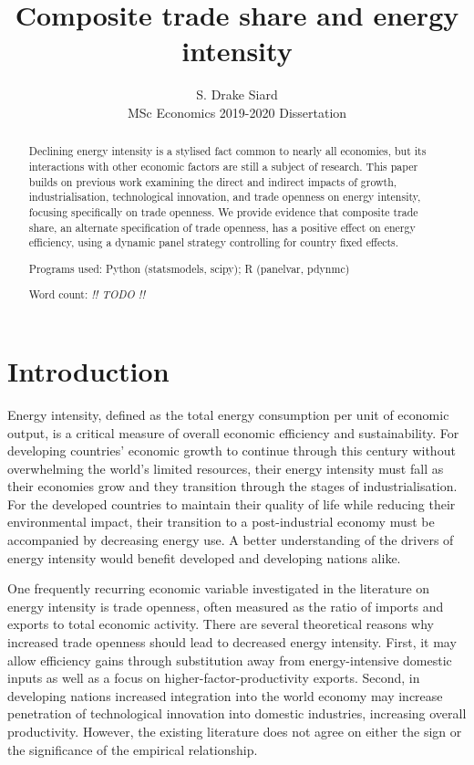 \documentclass[12pt,a4paper]{article}
\title{Composite trade share and energy intensity}
\author{S. Drake Siard\\
MSc Economics 2019-2020 Dissertation}
\date{}
\newcommand{\pkg}[1]{{\fontseries{b}\selectfont #1}}
\begin{document}
\maketitle

\begin{abstract}
Declining energy intensity is a stylised fact common to nearly all economies, but its interactions with other economic factors are still a subject of research.
This paper builds on previous work examining the direct and indirect impacts of growth, industrialisation, technological innovation, and trade openness on energy intensity, focusing specifically on trade openness. 
We provide evidence that composite trade share, an alternate specification of trade openness, has a positive effect on energy efficiency, using a dynamic panel strategy controlling for country fixed effects. 

Programs used: Python (\pkg{statsmodels}, \pkg{scipy}); R (\pkg{panelvar}, \pkg{pdynmc})

Word count: \emph{!! TODO !!}
 
\end{abstract}

\pagebreak

\tableofcontents

\pagebreak

\section{Introduction}\label{sec:introduction}

Energy intensity, defined as the total energy consumption per unit of economic output, is a critical measure of overall economic efficiency and sustainability.
For developing countries' economic growth to continue through this century without overwhelming the world's limited resources, their energy intensity must fall as their economies grow and they transition through the stages of industrialisation.
For the developed countries to maintain their quality of life while reducing their environmental impact, their transition to a post-industrial economy must be accompanied by decreasing energy use.
A better understanding of the drivers of energy intensity would benefit developed and developing nations alike.

One frequently recurring economic variable investigated in the literature on energy intensity is trade openness, often measured as the ratio of imports and exports to total economic activity.
There are several theoretical reasons why increased trade openness should lead to decreased energy intensity.
First, it may allow efficiency gains through substitution away from energy-intensive domestic
inputs as well as a focus on higher-factor-productivity exports. 
Second, in developing nations increased integration into the world economy may increase penetration of technological innovation into domestic industries, increasing overall productivity.
However, the existing literature does not agree on either the sign or the significance of the empirical relationship.
\end{document}
